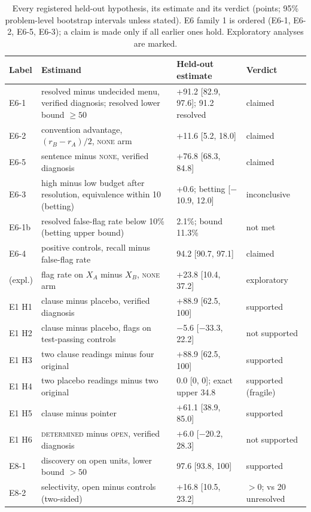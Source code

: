 \begin{table}[h]
\centering
\small
\caption{Every registered held-out hypothesis, its estimate and its verdict (points; 95\% problem-level bootstrap
intervals unless stated). E6 family 1 is ordered (E6-1, E6-2, E6-5, E6-3); a claim is made only if all earlier ones
hold. Exploratory analyses are marked.}
\label{tab:verdicts}
\begin{tabular}{p{1.4cm}p{7.2cm}p{4.0cm}p{1.6cm}}
\toprule
Label & Estimand & Held-out estimate & Verdict \\
\midrule
E6-1 & resolved minus undecided menu, verified diagnosis; resolved lower bound $\geq 50$ & +91.2 [82.9, 97.6]; 91.2 resolved & claimed \\
E6-2 & convention advantage, $(r_B - r_A)/2$, \textsc{none} arm & +11.6 [5.2, 18.0] & claimed \\
E6-5 & sentence minus \textsc{none}, verified diagnosis & +76.8 [68.3, 84.8] & claimed \\
E6-3 & high minus low budget after resolution, equivalence within 10 (betting) & +0.6; betting [$-$10.9, 12.0] & inconclusive \\
E6-1b & resolved false-flag rate below 10\% (betting upper bound) & 2.1\%; bound 11.3\% & not met \\
E6-4 & positive controls, recall minus false-flag rate & 94.2 [90.7, 97.1] & claimed \\
(expl.) & flag rate on $X_A$ minus $X_B$, \textsc{none} arm & +23.8 [10.4, 37.2] & exploratory \\
\midrule
E1 H1 & clause minus placebo, verified diagnosis & +88.9 [62.5, 100] & supported \\
E1 H2 & clause minus placebo, flags on test-passing controls & $-$5.6 [$-$33.3, 22.2] & not supported \\
E1 H3 & two clause readings minus four original & +88.9 [62.5, 100] & supported \\
E1 H4 & two placebo readings minus two original & 0.0 [0, 0]; exact upper 34.8 & supported (fragile) \\
E1 H5 & clause minus pointer & +61.1 [38.9, 85.0] & supported \\
E1 H6 & \textsc{determined} minus \textsc{open}, verified diagnosis & +6.0 [$-$20.2, 28.3] & not supported \\
\midrule
E8-1 & discovery on open units, lower bound $>50$ & 97.6 [93.8, 100] & supported \\
E8-2 & selectivity, open minus controls (two-sided) & +16.8 [10.5, 23.2] & $>0$; vs 20 unresolved \\

\end{tabular}
\end{table}
